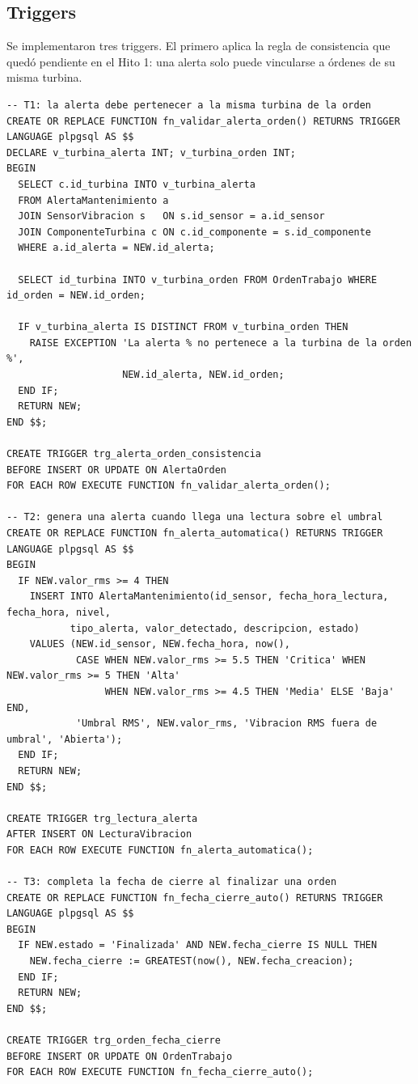 \documentclass[11pt,a4paper]{article}
\begin{document}
\subsection{Triggers}

Se implementaron tres triggers. El primero aplica la regla de consistencia que
quedó pendiente en el Hito 1: una alerta solo puede vincularse a órdenes de su
misma turbina.

\begin{lstlisting}
-- T1: la alerta debe pertenecer a la misma turbina de la orden
CREATE OR REPLACE FUNCTION fn_validar_alerta_orden() RETURNS TRIGGER
LANGUAGE plpgsql AS $$
DECLARE v_turbina_alerta INT; v_turbina_orden INT;
BEGIN
  SELECT c.id_turbina INTO v_turbina_alerta
  FROM AlertaMantenimiento a
  JOIN SensorVibracion s   ON s.id_sensor = a.id_sensor
  JOIN ComponenteTurbina c ON c.id_componente = s.id_componente
  WHERE a.id_alerta = NEW.id_alerta;

  SELECT id_turbina INTO v_turbina_orden FROM OrdenTrabajo WHERE id_orden = NEW.id_orden;

  IF v_turbina_alerta IS DISTINCT FROM v_turbina_orden THEN
    RAISE EXCEPTION 'La alerta % no pertenece a la turbina de la orden %',
                    NEW.id_alerta, NEW.id_orden;
  END IF;
  RETURN NEW;
END $$;

CREATE TRIGGER trg_alerta_orden_consistencia
BEFORE INSERT OR UPDATE ON AlertaOrden
FOR EACH ROW EXECUTE FUNCTION fn_validar_alerta_orden();

-- T2: genera una alerta cuando llega una lectura sobre el umbral
CREATE OR REPLACE FUNCTION fn_alerta_automatica() RETURNS TRIGGER
LANGUAGE plpgsql AS $$
BEGIN
  IF NEW.valor_rms >= 4 THEN
    INSERT INTO AlertaMantenimiento(id_sensor, fecha_hora_lectura, fecha_hora, nivel,
           tipo_alerta, valor_detectado, descripcion, estado)
    VALUES (NEW.id_sensor, NEW.fecha_hora, now(),
            CASE WHEN NEW.valor_rms >= 5.5 THEN 'Critica' WHEN NEW.valor_rms >= 5 THEN 'Alta'
                 WHEN NEW.valor_rms >= 4.5 THEN 'Media' ELSE 'Baja' END,
            'Umbral RMS', NEW.valor_rms, 'Vibracion RMS fuera de umbral', 'Abierta');
  END IF;
  RETURN NEW;
END $$;

CREATE TRIGGER trg_lectura_alerta
AFTER INSERT ON LecturaVibracion
FOR EACH ROW EXECUTE FUNCTION fn_alerta_automatica();

-- T3: completa la fecha de cierre al finalizar una orden
CREATE OR REPLACE FUNCTION fn_fecha_cierre_auto() RETURNS TRIGGER
LANGUAGE plpgsql AS $$
BEGIN
  IF NEW.estado = 'Finalizada' AND NEW.fecha_cierre IS NULL THEN
    NEW.fecha_cierre := GREATEST(now(), NEW.fecha_creacion);
  END IF;
  RETURN NEW;
END $$;

CREATE TRIGGER trg_orden_fecha_cierre
BEFORE INSERT OR UPDATE ON OrdenTrabajo
FOR EACH ROW EXECUTE FUNCTION fn_fecha_cierre_auto();
\end{lstlisting}
\end{document}
